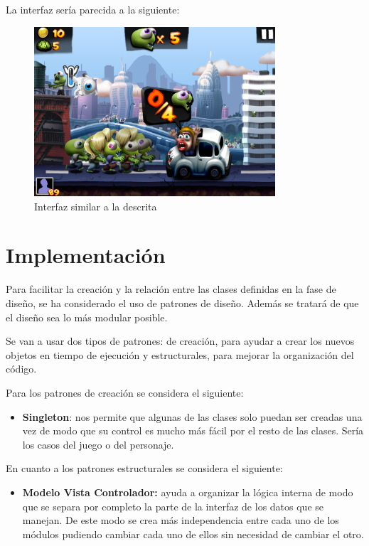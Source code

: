 \documentclass[palatino]{apuntes}
\begin{document}
La interfaz sería parecida a la siguiente:

\begin{figure}[hbtp]
    \centering
    \includegraphics[width=0.8\textwidth]{img/captura_zombies.png}
    \caption{Interfaz similar a la descrita}
    \label{fig:interfazzombie}
\end{figure}


\chapter{Implementación}
Para facilitar la creación y la relación entre las clases definidas en la fase de diseño, se ha considerado el uso de patrones de diseño. Además se tratará de que el diseño sea lo más modular posible.

Se van a usar dos tipos de patrones: de creación, para ayudar a crear los nuevos objetos en tiempo de ejecución y estructurales, para mejorar la organización del código.

Para los patrones de creación se considera el siguiente:
\begin{itemize}
	\item \textbf{Singleton}: nos permite que algunas de las clases solo puedan ser creadas una vez de modo que su control es mucho más fácil por el resto de las clases. Sería los casos del juego o del personaje.
\end{itemize}

En cuanto a los patrones estructurales se considera el siguiente:
\begin{itemize}
	\item \textbf{Modelo Vista Controlador:} ayuda a organizar la lógica interna de modo que se separa por completo la parte de la interfaz de los datos que se manejan. De este modo se crea más independencia entre cada uno de los módulos pudiendo cambiar cada uno de ellos sin necesidad de cambiar el otro.
\end{itemize}
\end{document}
